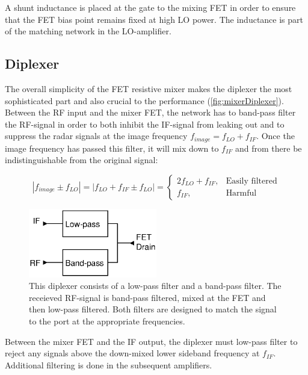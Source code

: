 			 A shunt inductance is placed at the gate to the mixing FET in order to ensure that the FET bias point remains fixed at high LO power. The inductance is part of the matching network in the LO-amplifier.

		\subsection{Diplexer}
			The overall simplicity of the FET resistive mixer makes the diplexer the most sophisticated part and also crucial to the performance (\autoref{fig:mixerDiplexer}). Between the RF input and the mixer FET, the network has to band-pass filter the RF-signal in order to both inhibit the IF-signal from leaking out and to suppress the radar signals at the image frequency $f_{image}=f_{LO}+f_{IF}$. Once the image frequency has passed this filter, it will mix down to $f_{IF}$ and from there be indistinguishable from the original signal:

			\begin{equation}
				|f_{image}\pm f_{LO}| = |f_{LO}+f_{IF}\pm f_{LO}| = \left \{
				\begin{array}{ll}
					2f_{LO}+f_{IF}, & \text{Easily filtered} \\
					f_{IF},	& \text{Harmful}
				\end{array}
				\right.
			\end{equation}

			\begin{figure}[hbt!]
				\centering
				\includegraphics[width=0.5\textwidth]{fig/mixer/diplexer}
				\caption[Mixer diplexer signal path]{This diplexer consists of a low-pass filter and a band-pass filter. The receieved RF-signal is band-pass filtered, mixed at the FET and then low-pass filtered. Both filters are designed to match the signal to the port at the appropriate frequencies.}\label{fig:mixerDiplexer}
			\end{figure}

			Between the mixer FET and the IF output, the diplexer must low-pass filter to reject any signals above the down-mixed lower sideband frequency at $f_{IF}$. Additional filtering is done in the subsequent amplifiers.

